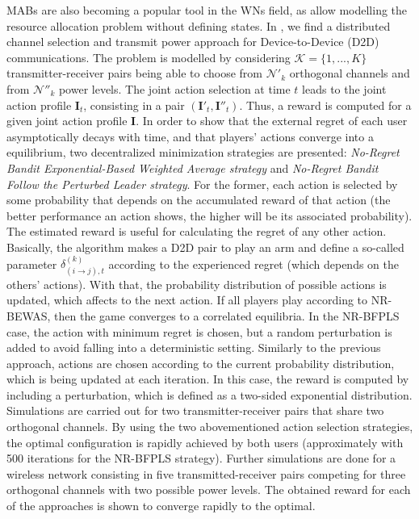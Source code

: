 \documentclass[12pt, a4paper,twoside]{tesi_upf}
\begin{document}
				MABs are also becoming a popular tool in the WNs field, as allow modelling the resource allocation problem without defining states. In \cite{maghsudi2015joint}, we find a distributed channel selection and transmit power approach for Device-to-Device (D2D) communications. The problem is modelled by considering $\mathcal{K}=\{1,...,K\}$ transmitter-receiver pairs being able to choose from $\mathcal{N}'_k$ orthogonal channels and from $\mathcal{N}''_k$ power levels. The joint action selection at time $t$ leads to the joint action profile $\textbf{I}_t$, consisting in a pair $(\textbf{I}'_t,\textbf{I}''_t)$. Thus, a reward is computed for a given joint action profile \textbf{I}. In order to show that the external regret of each user asymptotically decays with time, and that players’ actions converge into a equilibrium, two decentralized minimization strategies are presented: \textit{No-Regret Bandit Exponential-Based Weighted Average strategy} and \textit{No-Regret Bandit Follow the Perturbed Leader strategy}. For the former, each action is selected by some probability that depends on the accumulated reward of that action (the better performance an action shows, the higher will be its associated probability). The estimated reward is useful for calculating the regret of any other action. Basically, the algorithm makes a D2D pair to play an arm and define a so-called parameter $\delta_{(i \rightarrow j),t}^{(k)}$ according to the experienced regret (which depends on the others' actions). With that, the probability distribution of possible actions is updated, which affects to the next action. If all players play according to NR-BEWAS, then the game converges to a correlated equilibria. In the NR-BFPLS case, the action with minimum regret is chosen, but a random perturbation is added to avoid falling into a deterministic setting. Similarly to the previous approach, actions are chosen according to the current probability distribution, which is being updated at each iteration. In this case, the reward is computed by including a perturbation, which is defined as a two-sided exponential distribution. Simulations are carried out for two transmitter-receiver pairs that share two orthogonal channels. By using the two abovementioned action selection strategies, the optimal configuration is rapidly achieved by both users (approximately with 500 iterations for the NR-BFPLS strategy). Further simulations are done for a wireless network consisting in five transmitted-receiver pairs competing for three orthogonal channels with two possible power levels. The obtained reward for each of the approaches is shown to converge rapidly to the optimal.
				
\end{document}
